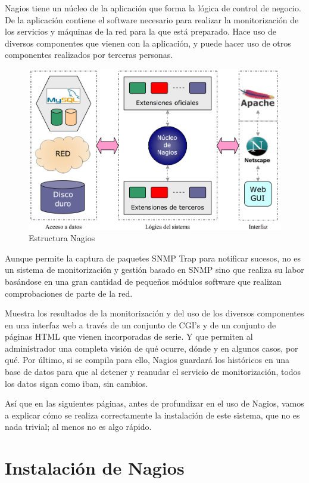 \documentclass[11pt,a4paper]{article}
\begin{document}
Nagios tiene un núcleo de la aplicación que forma la lógica de control de negocio. De la aplicación contiene el software necesario para realizar la monitorización de los servicios y máquinas de la red para la que está preparado. Hace uso de diversos componentes que vienen con la aplicación, y puede hacer uso de otros componentes realizados por terceras personas.

\begin{figure}[hbtp]
\centerline{\includegraphics[width=12cm]{images/nagiosCore.png}}
\caption{Estructura Nagios}
\label{figuraEstructuraNagios}
\end{figure}

Aunque permite la captura de paquetes SNMP Trap para notificar sucesos, no es un sistema de monitorización y gestión basado en SNMP sino que realiza su labor basándose en una gran cantidad de pequeños módulos software que realizan comprobaciones de parte de la red.

Muestra los resultados de la monitorización y del uso de los diversos componentes en una interfaz web a través de un conjunto de CGI’s y de un conjunto de páginas HTML que vienen incorporadas de serie. Y que permiten al administrador una completa visión de qué ocurre, dónde y en algunos casos, por qué.
Por último, si se compila para ello, Nagios guardará los históricos en una base de datos para que al detener y reanudar el servicio de monitorización, todos los datos sigan como iban, sin cambios.

Así que en las siguientes páginas, antes de profundizar en el uso de Nagios, vamos a explicar cómo se realiza correctamente la instalación de este sistema, que no es nada trivial; al menos no es algo rápido.

\section{Instalación de Nagios}
\end{document}
